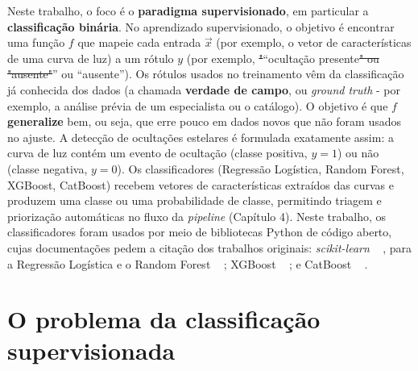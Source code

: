 \documentclass[msc]{on} %
\makeatletter
\providecommand{\DIFaddtex}[1]{{\protect\color{red}#1}} %
\providecommand{\DIFdeltex}[1]{{\protect\color{red}\sout{#1}}} %
\providecommand{\DIFaddbegin}{} %
\providecommand{\DIFaddend}{} %
\providecommand{\DIFdelbegin}{} %
\providecommand{\DIFdelend}{} %
\providecommand{\DIFadd}[1]{\texorpdfstring{\DIFaddtex{#1}}{#1}} %
\providecommand{\DIFdel}[1]{\texorpdfstring{\DIFdeltex{#1}}{}} %
\let\sout@orig\sout %
\renewcommand{\sout}[1]{\ifmmode\text{\sout@orig{\ensuremath{#1}}}\else\sout@orig{#1}\fi} %
\makeatother
\begin{document}
Neste trabalho, o foco é o \textbf{paradigma supervisionado}, em particular a \textbf{classificação binária}. No aprendizado supervisionado, o objetivo é encontrar uma função \(f\) que mapeie cada entrada \(\vec{x}\) (por exemplo, o vetor de características de uma curva de luz) a um rótulo \(y\) (por exemplo, \DIFdelbegin \DIFdel{"}\DIFdelend \DIFaddbegin \DIFadd{``}\DIFaddend ocultação presente\DIFdelbegin \DIFdel{" ou "ausente"}\DIFdelend \DIFaddbegin \DIFadd{'' ou ``ausente''}\DIFaddend ). Os rótulos usados no treinamento vêm da classificação já conhecida dos dados (a chamada \textbf{verdade de campo}, ou \textit{ground truth} - por exemplo, a análise prévia de um especialista ou o catálogo). O objetivo é que \(f\) \textbf{generalize} bem, ou seja, que erre pouco em dados novos que não foram usados no ajuste. A detecção de ocultações estelares é formulada exatamente assim: a curva de luz contém um evento de ocultação (classe positiva, \(y=1\)) ou não (classe negativa, \(y=0\)). Os classificadores (Regressão Logística, Random Forest, XGBoost, CatBoost) recebem vetores de características extraídos das curvas e produzem uma classe ou uma probabilidade de classe, permitindo triagem e priorização automáticas no fluxo da \textit{pipeline} (Capítulo 4). \DIFaddbegin \DIFadd{Neste trabalho, os classificadores foram usados por meio de bibliotecas Python de código aberto, cujas documentações pedem a citação dos trabalhos originais: }\textit{\DIFadd{scikit-learn}} \DIFadd{\mbox{%
\citep{ScikitLearn2011}}\hskip0pt%
, para a Regressão Logística e o Random Forest \mbox{%
\citep{Breiman2001}}\hskip0pt%
; XGBoost \mbox{%
\citep{Chen2016}}\hskip0pt%
; e CatBoost \mbox{%
\citep{Prokhorenkova2018}}\hskip0pt%
.
}\DIFaddend 

\section{O problema da classificação supervisionada}
\label{sec:problema_classificacao}
\label{sec:reglin_didatica}
\end{document}
